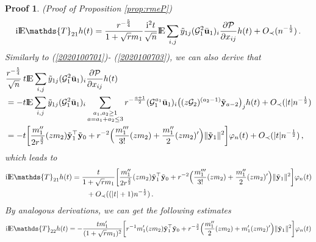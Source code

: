 \documentclass[12pt]{article}
\numberwithin{equation}{section}
\newtheorem{myPro}{Proof}
\theoremstyle{remark}
\newcommand{\1}{{\rm 1}\kern-0.24em{\rm I}}
\newcommand{\E}{{\rm I}\kern-0.18em{\rm E}}
\begin{document}
\begin{appendices}
\begin{myPro}{(Proof of Proposition  \ref{prop:rmeP})}
\begin{align*}
\mathrm{i}\E\mathds{T}_{21}h(t)= \frac{r^{-\frac 54 }}{1+\sqrt r m_1} \frac{\mathrm{i}^2 t}{\sqrt n} \E\sum_{i,j} \tilde{y}_{1j}    (\mathcal{G}_1^2 \bar{\bf u}_1)_i
 \frac{\partial \mathcal{P}}{\partial x_{ij}}h(t) + O_\prec(n^{-\frac 12})\,.
\end{align*}
Similarly to (\ref{2020100701})- (\ref{2020100703}),  we can also derive that  
\begin{align}\label{2020100801}
&\frac{r^{-\frac 54}}{\sqrt n} \, t\E\sum_{i,j} \tilde{y}_{1j}    (\mathcal{G}_1^2 \bar{\bf u}_1)_i
 \frac{\partial \mathcal{P}}{\partial x_{ij}}h(t)   \nonumber\\
 &=  -t\E\sum_{i,j} \tilde{y}_{1j}    (\mathcal{G}_1^2 \bar{\bf u}_1)_i\sum_{\begin{subarray}{c} a_1, a_2\geq 1\\ a=a_1+a_2\leq 3\end{subarray}} 
 r^{-\frac{a+1}{2}}(\mathcal{G}_1^{a_1}\bar{\bf u}_1)_{i} \big((z\mathcal{G}_2 )^{(a_2-1)}\tilde{\bf y}_{a-2}\big)_j   h(t)  + O_\prec(|t|n^{-\frac 12})\notag\\
 &= - t\bigg[ \frac{m_1''}{2r^{\frac 32}} (zm_2) \tilde{\bf y}_1^{\top}\tilde{\bf y}_{0} + r^{-2}\Big( \frac{m_1'''}{3!} (zm_2) + \frac{m_1''}{2} (zm_2)' \Big)\Vert\tilde{\bf y}_{1}\Vert^2\bigg]\varphi_n(t) + O_\prec(|t|n^{-\frac 12})\,,
\end{align}
which leads to 
\begin{align}\label{est:ET21P}
\mathrm{i}\E\mathds{T}_{21} h(t)&=
\frac{t}{1+\sqrt r m_1} \bigg[ \frac{m_1''}{2r^{\frac 32}} (zm_2) \tilde{\bf y}_1^{\top}\tilde{\bf y}_{0} + r^{-2} \Big( \frac{m_1'''}{3!} (zm_2) + \frac{m_1''}{2} (zm_2)' \Big)\Vert\tilde{\bf y}_{1}\Vert^2\bigg]\varphi_n(t) \notag\\
 &\qquad + O_\prec((|t|+1)n^{-\frac 12})\,.
\end{align}
By analogous derivations, we can get the following estimates
\begin{align}
\mathrm{i}\E\mathds{T}_{22}h(t)&=- \frac{tm_1'}{(1+\sqrt r m_1)^2}\bigg[r^{-1} {m_1'} (zm_2) \tilde{\bf y}_1^{\top}\tilde{\bf y}_{0} + r^{-\frac 32}\Big( \frac{m_1''}{2} (zm_2) + {m_1'} (zm_2)' \Big) \Vert\tilde{\bf y}_{1}\Vert^2\bigg]\varphi_n(t) \notag\\

\end{align}
\end{myPro}
\end{appendices}
\end{document}
